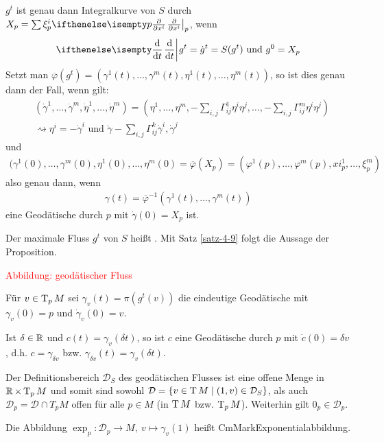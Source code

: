 \begin{bew}
\begin{enumerate}[label=(\Alph*)]
    $g^t$ ist genau dann Integralkurve von $S$ durch $X_p = \sum \xi_p^i\pdifffrac[p]{}{x^i}$, wenn
    \begin{align*}
      \difffrac{}{t}g^t = \dot g^t = S(g^t) \text{ und } g^0 = X_p
    \end{align*}
    Setzt man $\overline \varphi(g^t) = (\gamma^1(t), \ldots, \gamma^m(t),\eta^1(t), \ldots, \eta^m(t))$, so ist dies genau dann der Fall, wenn gilt:
    \begin{align*}
      & (\dot\gamma^1,\ldots, \dot\gamma^m,\dot\eta^1,\ldots, \dot\eta^m) = \left(\eta^1, \ldots, \eta^m, -\sum_{i,j}\Gamma_{ij}^1\eta^i\eta^j, \ldots, -\sum_{i,j}\Gamma_{ij}^m\eta^i\eta^j\right)\\
      & \rightsquigarrow \eta^i = -\dot\gamma^i \text{ und } \ddot\gamma-\sum_{i,j}\Gamma_{ij}^k\dot\gamma^i,\dot\gamma^j
    \end{align*}
    und 
    \begin{align*}
      (\gamma^1(0), \ldots, \gamma^m(0), \eta^1(0), \ldots, \eta^m(0) = \overline\varphi(X_p) = (\varphi^1(p), \ldots, \varphi^m(p), xi_p^1, \ldots, \xi_p^m)
    \end{align*}
    also genau dann, wenn
    \begin{align*}
      \gamma(t) = \overline\varphi^{-1}(\gamma^1(t), \ldots, \gamma^m(t))
    \end{align*}
    eine Geodätische durch $p$ mit $\dot \gamma(0) = X_p$ ist.

    Der maximale Fluss $g^t$ von $S$ heißt .
    Mit Satz \ref{satz-4-9} folgt die Aussage der Proposition.
  \end{enumerate}
\end{bew}

\begin{center}
  \textcolor{red}{Abbildung: geodätischer Fluss}
\end{center}

Für $v \in \operatorname{T}_pM$ sei $\gamma_v(t) = \pi(g^t(v))$ die eindeutige Geodätische mit $\gamma_v(0) = p$ und $\dot \gamma_v(0) = v$.

Ist $\delta \in \operatorname{\mathbb{R}}$ und $c(t) = \gamma_v(\delta t)$, so ist $c$ eine Geodätische durch $p$ mit $\dot c(0) = \delta v$, d.h. $c = \gamma_{\delta v}$ bzw. $\gamma_{\delta v}(t) = \gamma_v(\delta t)$.

Der Definitionsbereich $\mathcal D_S$ des geodätischen Flusses ist eine offene Menge in $\operatorname{\mathbb{R}} \times \operatorname{T}_pM$ und somit sind sowohl $\mathcal D = \{v \in \operatorname{T} M \mid (1,v) \in \mathcal D_S\}$, als auch $\mathcal D_p = \mathcal D \cap T_pM$ offen für alle $p \in M$ (in $\operatorname{T} M$ bzw. $\operatorname{T}_pM$). Weiterhin gilt $0_p \in \mathcal D_p$.

\begin{Dfn}
  Die Abbildung $\exp_p\colon\mathcal D_p \to M, \ v \mapsto \gamma_v(1)$ heißt CmMark{Exponentialabbildung}.
\end{Dfn}


